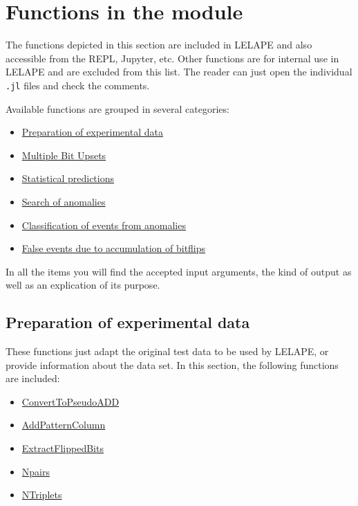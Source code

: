  \section{Functions in the module}
 The functions depicted in this section are included in LELAPE and also accessible from the REPL, Jupyter, etc. Other functions are for internal use in LELAPE and are excluded from this list. The reader can just open the individual \texttt{.jl} files and check the comments.
 
 Available functions are grouped in several categories:
 \begin{itemize}
 	\item \hyperref[SubseC:PreparationExpdata]{Preparation of experimental data}
 	\item \hyperref[SubSeC:MBUs]{Multiple Bit Upsets}
 	\item \hyperref[Subsec:StatisticalPredictions]{Statistical predictions}
 	\item \hyperref[Subsec:SearchOfAnomalies]{Search of anomalies}
 	\item \hyperref [SubSec:ClassificationEventsFromAnomalies]{Classification of events from anomalies}
 	\item \hyperref[SubSec:FalseEvents]{False events due to accumulation of bitflips}
 \end{itemize}
 In all the items you will find the accepted input arguments, the kind of output as well as an explication of its purpose.
 \subsection{Preparation of experimental data}\label{SubseC:PreparationExpdata}
 These functions just adapt the original test data to be used by LELAPE, or provide information about the data set. In this section, the following functions are included:
 \begin{itemize}
 	\item \hyperref[Func:ConvertToPseudoADD]{ConvertToPseudoADD}
 	\item \hyperref[Func:AddPatternColumn]{AddPatternColumn}
 	\item \hyperref[Func:ExtractFlippedBits]{ExtractFlippedBits}
 	\item \hyperref[Func:Npairs]{Npairs}
 	\item \hyperref[Func:NTriplets]{NTriplets}
 \end{itemize}
